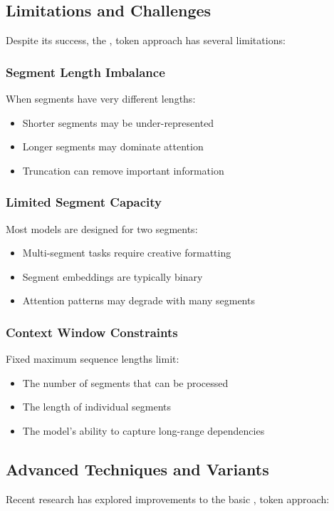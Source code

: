 \subsection{Limitations and Challenges}

Despite its success, the \sep{} token approach has several limitations:

\subsubsection{Segment Length Imbalance}
When segments have very different lengths:
\begin{itemize}
\item Shorter segments may be under-represented
\item Longer segments may dominate attention
\item Truncation can remove important information
\end{itemize}

\subsubsection{Limited Segment Capacity}
Most models are designed for two segments:
\begin{itemize}
\item Multi-segment tasks require creative formatting
\item Segment embeddings are typically binary
\item Attention patterns may degrade with many segments
\end{itemize}

\subsubsection{Context Window Constraints}
Fixed maximum sequence lengths limit:
\begin{itemize}
\item The number of segments that can be processed
\item The length of individual segments
\item The model's ability to capture long-range dependencies
\end{itemize}

\subsection{Advanced Techniques and Variants}

Recent research has explored improvements to the basic \sep{} token approach:

